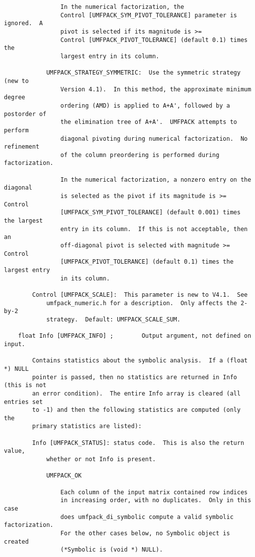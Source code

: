 \documentclass[11pt]{article}
\begin{document}
{\begin{verbatim}
                In the numerical factorization, the
                Control [UMFPACK_SYM_PIVOT_TOLERANCE] parameter is ignored.  A
                pivot is selected if its magnitude is >=
                Control [UMFPACK_PIVOT_TOLERANCE] (default 0.1) times the
                largest entry in its column.

            UMFPACK_STRATEGY_SYMMETRIC:  Use the symmetric strategy (new to
                Version 4.1).  In this method, the approximate minimum degree
                ordering (AMD) is applied to A+A', followed by a postorder of
                the elimination tree of A+A'.  UMFPACK attempts to perform
                diagonal pivoting during numerical factorization.  No refinement
                of the column preordering is performed during factorization.

                In the numerical factorization, a nonzero entry on the diagonal
                is selected as the pivot if its magnitude is >= Control
                [UMFPACK_SYM_PIVOT_TOLERANCE] (default 0.001) times the largest
                entry in its column.  If this is not acceptable, then an
                off-diagonal pivot is selected with magnitude >= Control
                [UMFPACK_PIVOT_TOLERANCE] (default 0.1) times the largest entry
                in its column.

        Control [UMFPACK_SCALE]:  This parameter is new to V4.1.  See
            umfpack_numeric.h for a description.  Only affects the 2-by-2
            strategy.  Default: UMFPACK_SCALE_SUM.

    float Info [UMFPACK_INFO] ;        Output argument, not defined on input.

        Contains statistics about the symbolic analysis.  If a (float *) NULL
        pointer is passed, then no statistics are returned in Info (this is not
        an error condition).  The entire Info array is cleared (all entries set
        to -1) and then the following statistics are computed (only the
        primary statistics are listed):

        Info [UMFPACK_STATUS]: status code.  This is also the return value,
            whether or not Info is present.

            UMFPACK_OK

                Each column of the input matrix contained row indices
                in increasing order, with no duplicates.  Only in this case
                does umfpack_di_symbolic compute a valid symbolic factorization.
                For the other cases below, no Symbolic object is created
                (*Symbolic is (void *) NULL).


\end{verbatim}}
\end{document}

